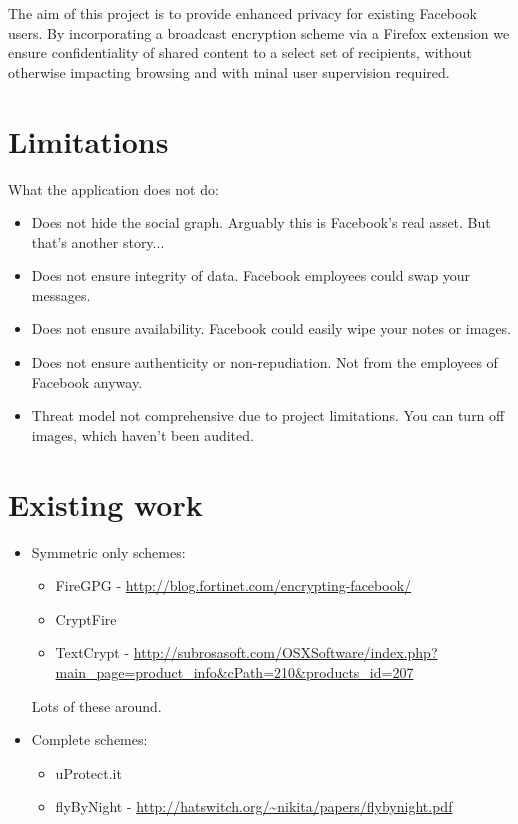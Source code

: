 The aim of this project is to provide enhanced privacy for existing Facebook users. By incorporating a broadcast encryption scheme via a Firefox extension we ensure confidentiality of shared content to a select set of recipients, without otherwise impacting browsing and with minal user supervision required.

\section{Limitations}

What the application does not do:
\begin{itemize}
    \item Does not hide the social graph. Arguably this is Facebook's real asset. But that's another story...
    \item Does not ensure integrity of data. Facebook employees could swap your messages.
    \item Does not ensure availability. Facebook could easily wipe your notes or images.
    \item Does not ensure authenticity or non-repudiation. Not from the employees of Facebook anyway.
    \item Threat model not comprehensive due to project limitations. You can turn off images, which haven't been audited.
\end{itemize}


\section{Existing work}
\begin{itemize}
    \item Symmetric only schemes:
    
    \begin{itemize}
        \item FireGPG - \url{http://blog.fortinet.com/encrypting-facebook/}
        \item CryptFire
        \item TextCrypt - \url{http://subrosasoft.com/OSXSoftware/index.php?main_page=product_info&cPath=210&products_id=207}
    \end{itemize}
    
    Lots of these around.
    
    \item Complete schemes:
    
    \begin{itemize}
        \item uProtect.it
        \item flyByNight - \url{http://hatswitch.org/~nikita/papers/flybynight.pdf}
    \end{itemize}
\end{itemize}





